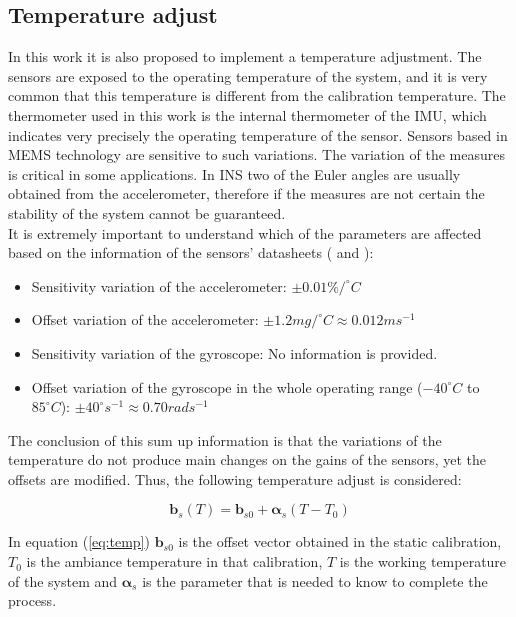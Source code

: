 \documentclass[conference]{IEEEtran}
\newcommand{\refp}[1]{(\ref{#1})}
\begin{document}
\subsection{Temperature adjust}
\label{sec:param_temp}

In this work it is also proposed to implement a temperature adjustment. The sensors are exposed to the operating temperature of the system, and it is very common that this temperature is different from the calibration temperature. The thermometer used in this work is the internal thermometer of the IMU, which indicates very precisely the operating temperature of the sensor. Sensors based in MEMS technology are sensitive to such variations. The variation of the measures is critical in some applications. In INS two of the Euler angles are usually obtained from the accelerometer, therefore if the measures are not certain the stability of the system cannot be guaranteed.\\

It is extremely important to understand which of the parameters are affected based on the information of the sensors' datasheets (\cite{bib:acc_data} and \cite{bib:gyro_data}):

\begin{itemize}
\item Sensitivity variation of the accelerometer: $\pm 0.01 \%/^\circ C$
\item Offset variation of the accelerometer: $\pm 1.2mg/^\circ C \approx 0.012m s^{-1}$
\item Sensitivity variation of the gyroscope: No information is provided. 
\item Offset variation of the gyroscope in the whole operating range ($-40^\circ C$ to $85^\circ C$): $\pm 40 ^\circ s^{-1} \approx 0.70 rad s^{-1}$
\end{itemize}

The conclusion of this sum up information is that the variations of the temperature do not produce main changes on the gains of the sensors, yet the offsets are modified. Thus, the following temperature adjust is considered:

\begin{equation}
\mathbf{b}_s(T) = \mathbf{b}_{s0} + \boldsymbol{\alpha}_s (T-T_0)
\label{eq:temp}
\end{equation}

In equation \refp{eq:temp} $\mathbf{b}_{s0}$ is the offset vector obtained in the static calibration, $T_0$ is the ambiance temperature in that calibration, $T$ is the working temperature of the system and $\boldsymbol{\alpha}_s$ is the parameter that is needed to know to complete the process.\\ 
\end{document}
